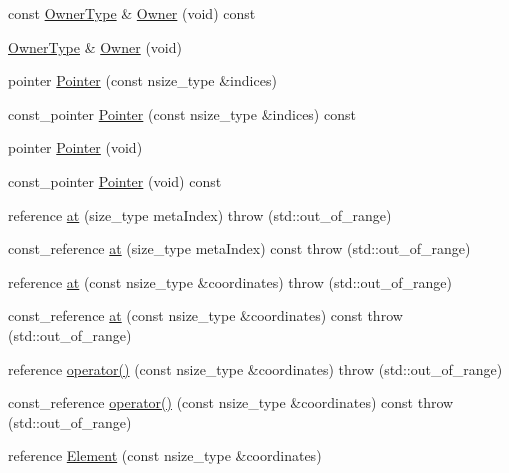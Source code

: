 \begin{DoxyCompactItemize}
\item 
const \hyperlink{classvct_dynamic_const_n_array_base_aad4328d01dc43be4b9047d594ed2ae8d}{Owner\-Type} \& \hyperlink{classvct_dynamic_n_array_base_a891190414183e5195fa8d12325c1bddd}{Owner} (void) const 
\item 
\hyperlink{classvct_dynamic_const_n_array_base_aad4328d01dc43be4b9047d594ed2ae8d}{Owner\-Type} \& \hyperlink{classvct_dynamic_n_array_base_ac4a9c4cedda9a2f8e794f913211b6f97}{Owner} (void)
\item 
pointer \hyperlink{classvct_dynamic_n_array_base_a815d8e920b006130a100225bd9d0b5ab}{Pointer} (const nsize\-\_\-type \&indices)
\item 
const\-\_\-pointer \hyperlink{classvct_dynamic_n_array_base_ad6ac2380e5d4b30c218878998e775c76}{Pointer} (const nsize\-\_\-type \&indices) const 
\item 
pointer \hyperlink{classvct_dynamic_n_array_base_af34333ee2ce4b7229ce27949643a430c}{Pointer} (void)
\item 
const\-\_\-pointer \hyperlink{classvct_dynamic_n_array_base_a2ef4c81d62183d24e859be570a6f6f86}{Pointer} (void) const 
\item 
reference \hyperlink{classvct_dynamic_n_array_base_a72c22020326e95f1914a5250e8dca9dd}{at} (size\-\_\-type meta\-Index)  throw (std\-::out\-\_\-of\-\_\-range)
\item 
const\-\_\-reference \hyperlink{classvct_dynamic_n_array_base_a0fc646058ec86e1256dc02131c3f5d42}{at} (size\-\_\-type meta\-Index) const   throw (std\-::out\-\_\-of\-\_\-range)
\item 
reference \hyperlink{classvct_dynamic_n_array_base_abac9495fd15f5f0496b2c3d76beddfb5}{at} (const nsize\-\_\-type \&coordinates)  throw (std\-::out\-\_\-of\-\_\-range)
\item 
const\-\_\-reference \hyperlink{classvct_dynamic_n_array_base_a8bf49f4e938b24befef617c24a7b8633}{at} (const nsize\-\_\-type \&coordinates) const   throw (std\-::out\-\_\-of\-\_\-range)
\item 
reference \hyperlink{classvct_dynamic_n_array_base_a1ee205787762a94a8b3f88add005fd2b}{operator()} (const nsize\-\_\-type \&coordinates)  throw (std\-::out\-\_\-of\-\_\-range)
\item 
const\-\_\-reference \hyperlink{classvct_dynamic_n_array_base_ab64ae472f6333bc618acdf8b50e8238a}{operator()} (const nsize\-\_\-type \&coordinates) const   throw (std\-::out\-\_\-of\-\_\-range)
\item 
reference \hyperlink{classvct_dynamic_n_array_base_ac0158fc2557971ecb7d25d73e2c084ba}{Element} (const nsize\-\_\-type \&coordinates)

\end{DoxyCompactItemize}
